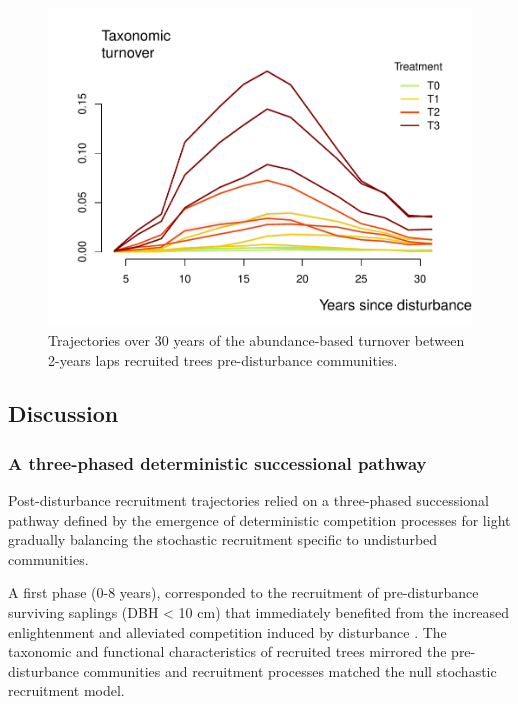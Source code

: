 \documentclass[
  11pt,
  french,
  A4paper,
  extrafontsizes,onecolumn,openright
  ]{memoir}
\begin{document}
\begin{figure}

{\centering \includegraphics[width=1\linewidth]{Manuscript_files/figure-latex/Turnover-1} 

}

\caption{Trajectories over 30 years of the abundance-based turnover between 2-years laps recruited trees pre-disturbance communities.}\label{fig:Turnover}
\end{figure}

\subsection{Discussion}\label{discussion-2}

\subsubsection{A three-phased deterministic successional
pathway}\label{a-three-phased-deterministic-successional-pathway}

Post-disturbance recruitment trajectories relied on a three-phased
successional pathway defined by the emergence of deterministic
competition processes for light gradually balancing the stochastic
recruitment specific to undisturbed communities.

A first phase (0-8 years), corresponded to the recruitment of
pre-disturbance surviving saplings (DBH \textless{} 10 cm) that
immediately benefited from the increased enlightenment and alleviated
competition induced by disturbance \autocites{Denslow2000}{Herault2010}.
The taxonomic and functional characteristics of recruited trees mirrored
the pre-disturbance communities and recruitment processes matched the
null stochastic recruitment model.
\end{document}
